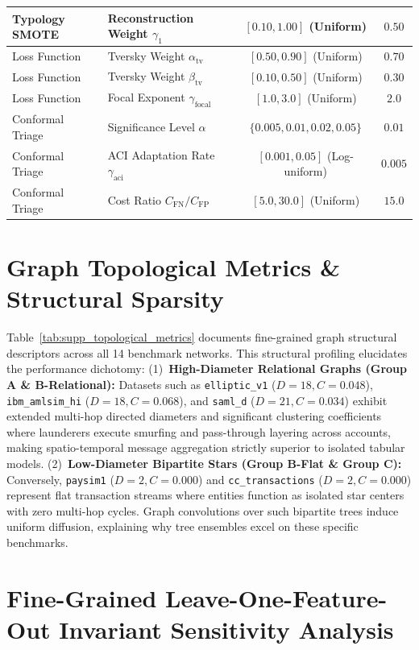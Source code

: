 \documentclass[journal,twoside]{IEEEtran}
\begin{document}
\begin{table}[htbp]
{\begin{tabular}{llcc}
Typology SMOTE & Reconstruction Weight $\gamma_1$ & $[0.10, 1.00]$ (Uniform) & $0.50$ \\
\midrule
Loss Function & Tversky Weight $\alpha_{\text{tv}}$ & $[0.50, 0.90]$ (Uniform) & $0.70$ \\
Loss Function & Tversky Weight $\beta_{\text{tv}}$ & $[0.10, 0.50]$ (Uniform) & $0.30$ \\
Loss Function & Focal Exponent $\gamma_{\text{focal}}$ & $[1.0, 3.0]$ (Uniform) & $2.0$ \\
\midrule
Conformal Triage & Significance Level $\alpha$ & $\{0.005, 0.01, 0.02, 0.05\}$ & $0.01$ \\
Conformal Triage & ACI Adaptation Rate $\gamma_{\text{aci}}$ & $[0.001, 0.05]$ (Log-uniform) & $0.005$ \\
Conformal Triage & Cost Ratio $C_{\text{FN}} / C_{\text{FP}}$ & $[5.0, 30.0]$ (Uniform) & $15.0$ \\
\bottomrule
\end{tabular}%
}
\end{table}

\section{Graph Topological Metrics \& Structural Sparsity}
\label{sec:supp_graph_topologies}

Table~\ref{tab:supp_topological_metrics} documents fine-grained graph structural descriptors across all 14 benchmark networks. This structural profiling elucidates the performance dichotomy: (1)~\textbf{High-Diameter Relational Graphs (Group A \& B-Relational):} Datasets such as \texttt{elliptic\_v1} ($D=18, C=0.048$), \texttt{ibm\_amlsim\_hi} ($D=18, C=0.068$), and \texttt{saml\_d} ($D=21, C=0.034$) exhibit extended multi-hop directed diameters and significant clustering coefficients where launderers execute smurfing and pass-through layering across accounts, making spatio-temporal message aggregation strictly superior to isolated tabular models. (2)~\textbf{Low-Diameter Bipartite Stars (Group B-Flat \& Group C):} Conversely, \texttt{paysim1} ($D=2, C=0.000$) and \texttt{cc\_transactions} ($D=2, C=0.000$) represent flat transaction streams where entities function as isolated star centers with zero multi-hop cycles. Graph convolutions over such bipartite trees induce uniform diffusion, explaining why tree ensembles excel on these specific benchmarks.


\section{Fine-Grained Leave-One-Feature-Out Invariant Sensitivity Analysis}
\label{sec:supp_feature_sensitivity}
\end{document}
